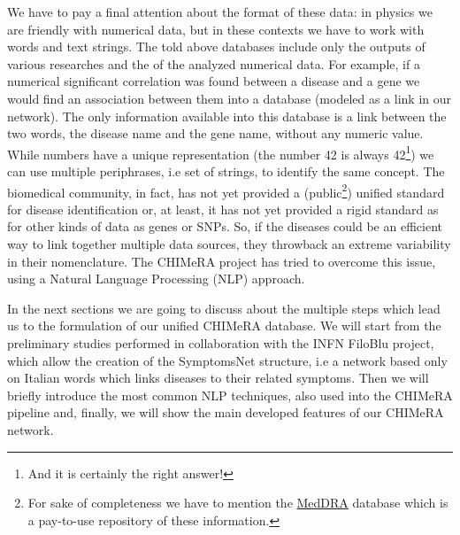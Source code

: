 \documentclass{standalone}
\begin{document}
We have to pay a final attention about the format of these data: in physics we are friendly with numerical data, but in these contexts we have to work with words and text strings.
The told above databases include only the outputs of various researches and the  of the analyzed numerical data.
For example, if a numerical significant correlation was found between a disease and a gene we would find an association between them into a database (modeled as a link in our network).
The only information available into this database is a link between the two words, the disease name and the gene name, without any numeric value.
While numbers have a unique representation (the number 42 is always 42\footnote{And it is certainly the right answer!}) we can use multiple periphrases, i.e set of strings, to identify the same concept.
The biomedical community, in fact, has not yet provided a (public\footnote{
  For sake of completeness we have to mention the \href{https://www.meddra.org/}{MedDRA} database which is a pay-to-use repository of these information.
}) unified standard for disease identification or, at least, it has not yet provided a rigid standard as for other kinds of data as genes or SNPs.
So, if the diseases could be an efficient way to link together multiple data sources, they throwback an extreme variability in their nomenclature.
The \textsf{CHIMeRA} project has tried to overcome this issue, using a Natural Language Processing (NLP) approach.

In the next sections we are going to discuss about the multiple steps which lead us to the formulation of our unified \textsf{CHIMeRA} database.
We will start from the preliminary studies performed in collaboration with the INFN FiloBlu project, which allow the creation of the \textsf{SymptomsNet} structure, i.e a  network based only on Italian words which links diseases to their related symptoms.
Then we will briefly introduce the most common NLP techniques, also used into the \textsf{CHIMeRA} pipeline and, finally, we will show the main developed features of our \textsf{CHIMeRA} network.

\end{document}
